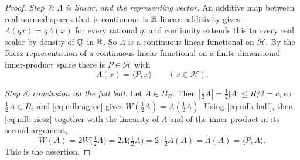 \begin{proof}
\emph{Step 7: $\Lambda$ is linear, and the representing vector.} An additive map
between real normed spaces that is continuous is $\mathbb{R}$-linear: additivity gives
$\Lambda(qx)=q\Lambda(x)$ for every rational $q$, and continuity extends this to
every real scalar by density of $\mathbb{Q}$ in $\mathbb{R}$. So $\Lambda$ is a continuous linear
functional on $\mathcal H$. By the Riesz representation of a continuous linear
functional on a finite-dimensional inner-product space there is $P\in\mathcal H$
with
\begin{equation}\label{eq:mlb-riesz}
  \Lambda(x)=\langle P,x\rangle\qquad(x\in\mathcal H).
\end{equation}

\emph{Step 8: conclusion on the full ball.} Let $A\in\overline B_R$. Then
$|\tfrac12A|=\tfrac12|A|\le R/2=c$, so $\tfrac12A\in\overline B_c$ and
\eqref{eq:mlb-agree} gives $W(\tfrac12A)=\Lambda(\tfrac12A)$. Using
\eqref{eq:mlb-half}, then \eqref{eq:mlb-riesz} together with the linearity of
$\Lambda$ and of the inner product in its second argument,
\[
  W(A)=2W\bigl(\tfrac12A\bigr)=2\Lambda\bigl(\tfrac12A\bigr)
   =2\cdot\tfrac12\Lambda(A)=\Lambda(A)=\langle P,A\rangle .
\]
This is the assertion.
\end{proof}
